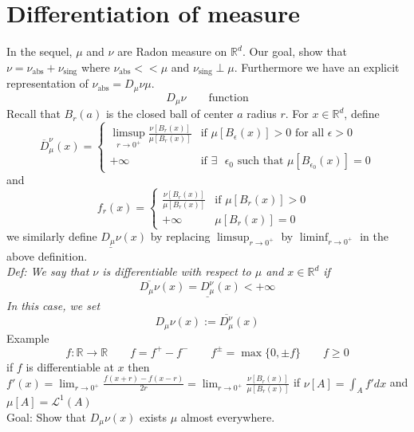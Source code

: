 \documentclass[11pt]{article}
\begin{document}
\section{Differentiation of measure}
In the sequel, $\mu$ and $\nu$ are Radon measure on  $ \mathbb{R}^{d}$. Our goal, show that
$\nu = \nu_{\text{abs}} + \nu_{\text{sing}}$ where $\nu_{\text{abs}} << \mu$ and $\nu_{\text{sing}} \perp \mu$.
Furthermore we have an explicit representation of $\nu_{\text{abs}} = D_\mu \nu \mu$.
\[
    D_\mu \nu  \qquad \text{function}
\] 
Recall that $B_r(a) $ is the closed ball of center  $a$ radius $r$. For $x \in \mathbb{R}^{d}$, define 
\[
\overline{ D}_\mu^{\nu}(x) = 
\begin{cases}
    \limsup_{r\to 0^{+}} \frac{\nu[B_r(x)]}{\mu[B_r(x)]} & \text{if $\mu[B_\epsilon(x)] > 0$ for all $\epsilon > 0$}\\
    +\infty & \text{if $\exists$ $\epsilon_0$ such that $\mu[B_{\epsilon_0}(x)] = 0$}
\end{cases}
\]
and
\[
f_r(x) =
\begin{cases}
    \frac{\nu[B_r(x)]}{\mu[B_r(x)]} & \text{if $\mu[B_r(x)] > 0$ }\\
    +\infty &  \mu[B_r(x)] = 0
\end{cases}
\] 
we similarly define $\underline{D_\mu \nu}(x)$  by replacing $\limsup_{r\to 0^{+}}$ by $\liminf_{r\to 0^{+}}$ in the above definition.\\
\emph{
    Def: We say that $\nu$ is differentiable with respect to $\mu$ and $x \in \mathbb{R}^{d}$ if
    \[
        \overline{D_\mu \nu }(x) = \underline{D_\mu^{\nu}}(x) < +\infty
    \] 
    In this case, we set
    \[
    D_\mu \nu (x) := \overline{D_\mu^{\nu}}(x)
    \] 
}
Example
\[
    f : \mathbb{R}\rightarrow \mathbb{R} \qquad f = f^{+} - f^{-} \qquad f^{\pm} = \max\{0, \pm f\} \qquad f \ge 0
\] 
if $f$ is differentiable at $x$ then $f'(x) = \lim_{r\to 0^{+}} \frac{f(x+r)-f(x-r)}{2r} = \lim_{r\to 0^{+}}\frac{\nu[B_r(x)]}{\mu[B_r(x)]}$  if $\nu[A] = \int_{A}^{}f'dx$
and $\mu[A] = \mathcal{L}^{1}(A)$\\
Goal: Show that $D_\mu \nu (x)$ exists $\mu$ almost everywhere.
\end{document}
